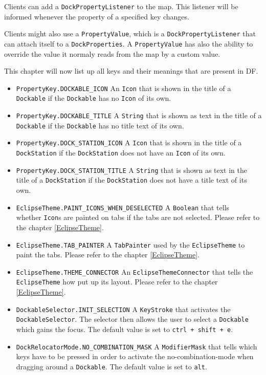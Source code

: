 \documentclass[a4paper,10pt]{article}
\newcommand{\src}[1]{\lstinline[basicstyle=\normalsize\ttfamily,keywordstyle=\normalsize\ttfamily,identifierstyle=\normalsize\ttfamily]|#1|}
\begin{document}
Clients can add a \src{DockPropertyListener} to the map. This listener will be informed whenever the property of a specified key changes.

Clients might also use a \src{PropertyValue}, which is a \src{DockPropertyListener} that can attach itself to a \src{DockProperties}. A \src{PropertyValue} has also the ability to override the value it normaly reads from the map by a custom value.

This chapter will now list up all keys and their meanings that are present in DF. 

\begin{itemize}
\item \src{PropertyKey.DOCKABLE_ICON} An \src{Icon} that is shown in the title of a \src{Dockable} if the \src{Dockable} has no \src{Icon} of its own.
\item \src{PropertyKey.DOCKABLE_TITLE} A \src{String} that is shown as text in the title of a \src{Dockable} if the \src{Dockable} has no title text of its own.
\item \src{PropertyKey.DOCK_STATION_ICON} A \src{Icon} that is shown in the title of a \src{DockStation} if the \src{DockStation} does not have an \src{Icon} of its own.
\item \src{PropertyKey.DOCK_STATION_TITLE} A \src{String} that is shown as text in the title of a \src{DockStation} if the \src{DockStation} does not have a title text of its own.
\item \src{EclipseTheme.PAINT_ICONS_WHEN_DESELECTED} A \src{Boolean} that tells \\whether \src{Icon}s are painted on tabs if the tabs are not selected. Please refer to the chapter \ref{EclipseTheme}.
\item \src{EclipseTheme.TAB_PAINTER} A \src{TabPainter} used by the \src{EclipseTheme} to paint the tabs. Please refer to the chapter \ref{EclipseTheme}.
\item \src{EclipseTheme.THEME_CONNECTOR} An \src{EclipseThemeConnector} that tells the \src{EclipseTheme} how put up its layout. Please refer to the chapter \ref{EclipseTheme}.
\item \src{DockableSelector.INIT_SELECTION} A \src{KeyStroke} that activates the \\\src{DockableSelector}. The selector then allows the user to select a \src{Dockable} which gains the focus. The default value is set to \src{ctrl + shift + e}.
\item \src{DockRelocatorMode.NO_COMBINATION_MASK} A \src{ModifierMask} that tells which keys have to be pressed in order to activate the no-combination-mode when dragging around a \src{Dockable}. The default value is set to \src{alt}.

\end{itemize}
\end{document}
